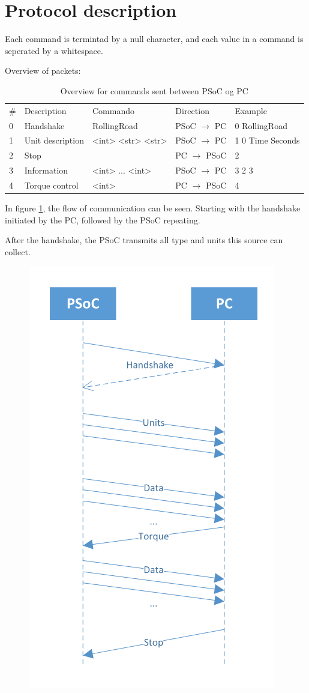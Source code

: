 \section{Protocol description}

Each command is termintad by a null character, and each value in a command is seperated by a whitespace.

Overview of packets:
\begin{table}[h!]
	\centering
	\label{Protocol:overview}
	\begin{tabular}{lllll}
		\# & Description 		& Commando    		& Direction             & Example     		\\
		0  & Handshake   		& RollingRoad 		& PSoC $\rightarrow$ PC & 0 RollingRoad 	\\
		1  & Unit description 	& <int> <str> <str> & PSoC $\rightarrow$ PC & 1 0 Time Seconds 	\\
		2  & Stop        		&            		& PC $\rightarrow$ PSoC	& 2        			\\
		3  & Information 		& <int> ... <int>	& PSoC $\rightarrow$ PC & 3 2 3 	    	\\
		4  & Torque control 	& <int>    			& PC $\rightarrow$ PSoC & 4    				\\
	\end{tabular}
	\caption{Overview for commands sent between PSoC og PC}
\end{table}

In figure \ref{fig:TimingDiagram}, the flow of communication can be seen. Starting with the handshake initiated by the PC, followed by the PSoC repeating.

After the handshake, the PSoC transmits all type and units this source can collect.

\begin{figure}
\centering
\includegraphics[width=0.5\linewidth]{Protocol/TimingDiagram}
\caption{}
\label{fig:TimingDiagram}
\end{figure}

